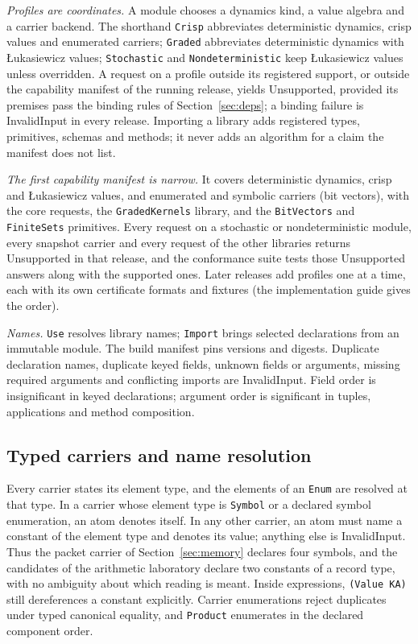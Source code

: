 \documentclass[11pt]{article}
\newcommand{\code}[1]{\texttt{#1}}
\theoremstyle{definition}
\theoremstyle{plain}
\begin{document}
\emph{Profiles are coordinates.} A module chooses a dynamics kind, a value algebra and a carrier
backend. The shorthand \code{Crisp} abbreviates deterministic dynamics, crisp values and
enumerated carriers; \code{Graded} abbreviates deterministic dynamics with \L{}ukasiewicz values;
\code{Stochastic} and \code{Nondeterministic} keep \L{}ukasiewicz values unless overridden. A
request on a profile outside its registered support, or outside the capability manifest of the
running release, yields Unsupported, provided its premises pass the binding rules of
Section~\ref{sec:deps}; a binding failure is InvalidInput in every release. Importing a library adds registered types, primitives,
schemas and methods; it never adds an algorithm for a claim the manifest does not list.

\emph{The first capability manifest is narrow.} It covers deterministic dynamics, crisp and
\L{}ukasiewicz values, and enumerated and symbolic carriers (bit vectors), with the core requests, the \code{GradedKernels} library, and the \code{BitVectors}
and \code{FiniteSets} primitives. Every
request on a stochastic or nondeterministic module, every snapshot carrier and every request of the
other libraries returns Unsupported in that release, and the conformance suite tests those
Unsupported answers along with the supported ones. Later releases add profiles one at a time, each
with its own certificate formats and fixtures (the implementation guide gives the order).

\emph{Names.} \code{Use} resolves library names; \code{Import} brings selected declarations from
an immutable module. The build manifest pins versions and digests. Duplicate declaration names,
duplicate keyed fields, unknown fields or arguments, missing required arguments and conflicting
imports are InvalidInput. Field order is insignificant in keyed declarations; argument order
is significant in tuples, applications and method composition.

\subsection{Typed carriers and name resolution}

Every carrier states its element type, and the elements of an \code{Enum} are resolved at that
type. In a carrier whose element type is \code{Symbol} or a declared symbol enumeration, an atom
denotes itself. In any other carrier, an atom must name a constant of the element type and
denotes its value; anything else is InvalidInput. Thus the packet carrier of
Section~\ref{sec:memory} declares four symbols, and the candidates of the arithmetic laboratory
declare two constants of a record type, with no ambiguity about which reading is meant. Inside
expressions, \code{(Value KA)} still dereferences a constant explicitly. Carrier enumerations
reject duplicates under typed canonical equality, and \code{Product} enumerates in the declared
component order.
\end{document}
